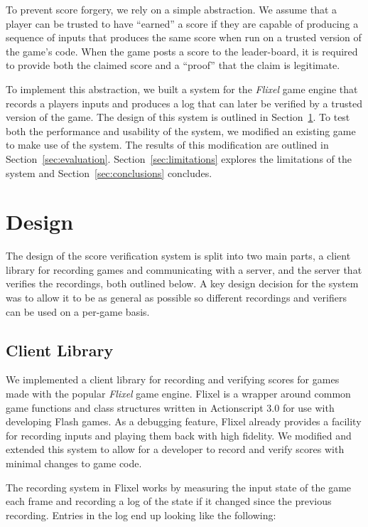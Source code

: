 \documentclass [11pt, twocolumn] {article}
\begin{document}
To prevent score forgery, we rely on a simple abstraction. We assume that a player can be trusted to have ``earned'' a score if they are capable of producing a sequence of inputs that produces the same score when run on a trusted version of the game's code. When the game posts a score to the leader-board, it is required to provide both the claimed score and a ``proof'' that the claim is legitimate. 

To implement this abstraction, we built a system for the \emph{Flixel} game engine that records a players inputs and produces a log that can later be verified by a trusted version of the game. The design of this system is outlined in Section~\ref{sec:design}. To test both the performance and usability of the system, we modified an existing game to make use of the system. The results of this modification are outlined in Section~\ref{sec:evaluation}. Section~\ref{sec:limitations} explores the limitations of the system and Section~\ref{sec:conclusions} concludes. 

\section { Design } 
\label{sec:design}

The design of the score verification system is split into two main parts, a client library for recording games and communicating with a server, and the server that verifies the recordings, both outlined below. A key design decision for the system was to allow it to be as general as possible so different recordings and verifiers can be used on a per-game basis.

\subsection { Client Library } 

We implemented a client library for recording and verifying scores for games made with the popular \emph{Flixel} game engine. Flixel is a wrapper around common game functions and class structures written in Actionscript 3.0 for use with developing Flash games. As a debugging feature, Flixel already provides a facility for recording inputs and playing them back with high fidelity. We modified and extended this system to allow for a developer to record and verify scores with minimal changes to game code. 

The recording system in Flixel works by measuring the input state of the game each frame and recording a log of the state if it changed since the previous recording. Entries in the log end up looking like the following:  
\end{document}
